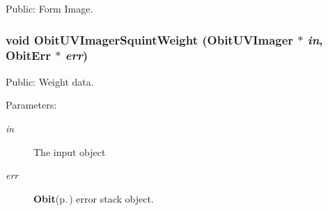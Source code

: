 Public: Form Image. 

\subsubsection{\setlength{\rightskip}{0pt plus 5cm}void Obit\-UVImager\-Squint\-Weight ({\bf Obit\-UVImager} $\ast$ {\em in}, {\bf Obit\-Err} $\ast$ {\em err})}\label{ObitUVImagerSquint_8h_a11}


Public: Weight data. 

\begin{Desc}
\item[Parameters:]
\begin{description}
\item[{\em in}]The input object \item[{\em err}]{\bf Obit}{\rm (p.\,\pageref{structObit})} error stack object. \end{description}
\end{Desc}
